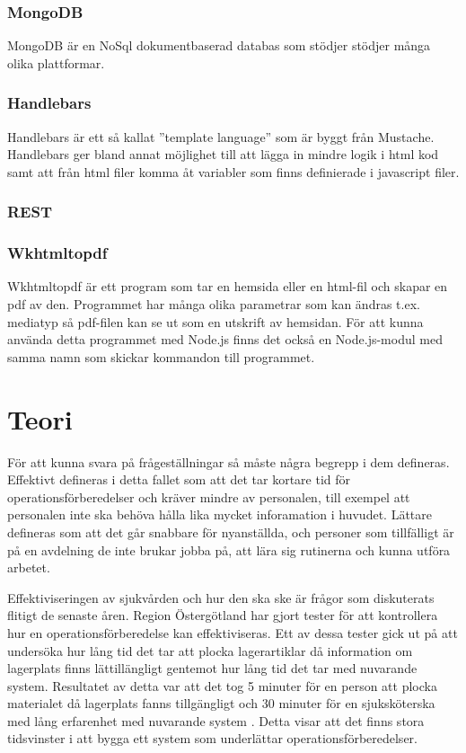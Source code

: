 \documentclass{article}
\begin{document}
\subsubsection{MongoDB}
MongoDB är en NoSql dokumentbaserad databas som stödjer stödjer många olika plattformar.

\subsubsection{Handlebars}
Handlebars är ett så kallat ''template language'' som är byggt från Mustache. Handlebars ger bland annat möjlighet till att lägga in mindre logik i html kod samt att från html filer komma åt variabler som finns definierade i javascript filer.

\subsubsection{REST}

\subsubsection{Wkhtmltopdf}
Wkhtmltopdf är ett program som tar en hemsida eller en html-fil och skapar en pdf av den. Programmet har många olika parametrar som kan ändras t.ex. mediatyp så pdf-filen kan se ut som en utskrift av hemsidan. För att kunna använda detta programmet med Node.js finns det också en Node.js-modul med samma namn som skickar kommandon till programmet.


\section{Teori}
För att kunna svara på frågeställningar så måste några begrepp i dem defineras.
Effektivt defineras i detta fallet som att det tar kortare tid för operationsförberedelser och kräver mindre av personalen, till exempel att personalen inte ska behöva hålla lika mycket inforamation i huvudet. 
Lättare defineras som att det går snabbare för nyanställda, och personer som tillfälligt är på en avdelning de inte brukar jobba på, att lära sig rutinerna och kunna utföra arbetet.

Effektiviseringen av sjukvården och hur den ska ske är frågor som diskuterats flitigt de senaste åren. Region Östergötland har gjort tester för att kontrollera hur en operationsförberedelse kan effektiviseras. Ett av dessa tester gick ut på att undersöka hur lång tid det tar att plocka lagerartiklar då information om lagerplats finns lättillängligt gentemot hur lång tid det tar med nuvarande system. Resultatet av detta var att det tog 5 minuter för en person att plocka materialet då lagerplats fanns tillgängligt och 30 minuter för en sjuksköterska med lång erfarenhet med nuvarande system \cite{Elisabeth}. Detta visar att det finns stora tidsvinster i att bygga ett system som underlättar operationsförberedelser.
\end{document}
